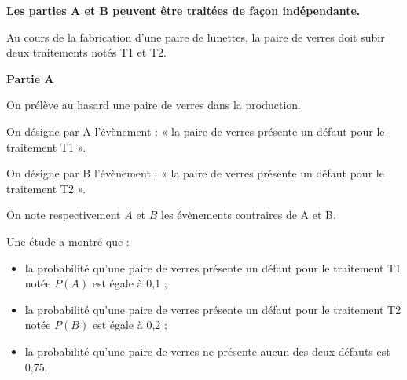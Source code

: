 \textbf{Les parties A et B peuvent être traitées de façon indépendante.}

\medskip

Au cours de la fabrication d’une paire de lunettes, la paire de verres doit subir deux traitements notés T1 et T2.

\medskip

\textbf{Partie A}

\medskip

On prélève au hasard une paire de verres dans la production.

\smallskip

On désigne par A l’évènement : « la paire de verres présente un défaut pour le traitement T1 ».

On désigne par B l’évènement : « la paire de verres présente un défaut pour le traitement T2 ».

On note respectivement $\overline{A}$ et $\overline{B}$ les évènements contraires de A et B.

\smallskip

Une étude a montré que :

\begin{itemize}
	\item la probabilité qu’une paire de verres présente un défaut pour le traitement T1 notée $P(A)$ est égale à 0,1 ;
	\item la probabilité qu’une paire de verres présente un défaut pour le traitement T2 notée $P(B)$ est égale à 0,2 ;
	\item la probabilité qu’une paire de verres ne présente aucun des deux défauts est 0,75.
\end{itemize}

